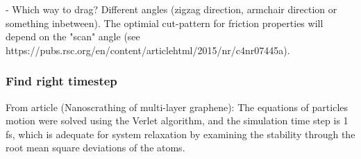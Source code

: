 - Which way to drag? Different angles (zigzag direction, armchair direction or something inbetween). The optimial cut-pattern for friction properties will depend on the "scan" angle (see https://pubs.rsc.org/en/content/articlehtml/2015/nr/c4nr07445a). 


\subsubsection*{Find right timestep}
From article (Nanoscrathing of multi-layer graphene): The equations of particles motion were solved using the Verlet algorithm, and the simulation time step is 1 fs, which is adequate for system relaxation by examining the stability through the root mean square deviations of the atoms.